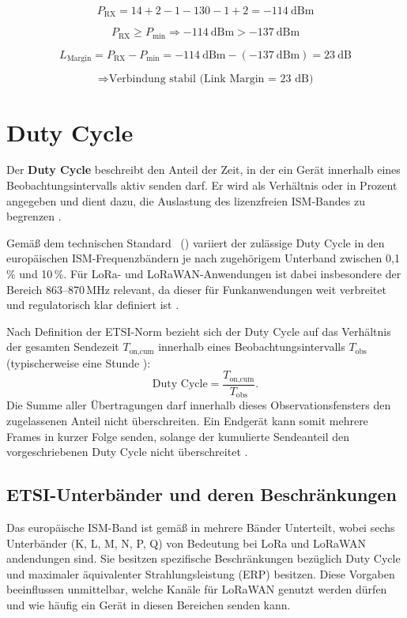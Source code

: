	\[
	P_\text{RX} = 14 + 2 - 1 - 130 - 1 + 2 = -114~\text{dBm}
	\]
	
	\[
	P_\text{RX} \geq P_\text{min} \Rightarrow -114~\text{dBm} > -137~\text{dBm}
	\]
	
	\[
	L_\text{Margin} = P_\text{RX} - P_\text{min} = -114~\text{dBm} - (-137~\text{dBm}) = 23~\text{dB}
	\]
	
	
	\[
	\Rightarrow \text{Verbindung stabil (Link Margin = 23~dB)}
	\]



\section{Duty Cycle}
	Der \textbf{Duty Cycle} beschreibt den Anteil der Zeit, in der ein Gerät innerhalb eines Beobachtungsintervalls aktiv senden darf. Er wird als Verhältnis oder in Prozent angegeben und dient dazu, die Auslastung des lizenzfreien ISM-Bandes zu begrenzen \cite{ETSI:2017}. 

	Gemä{\ss} dem technischen Standard ~(\cite{ETSI:2018b}) variiert der zulässige Duty Cycle in den europäischen ISM-Frequenzbändern je nach zugehörigem Unterband zwischen 0{,}1\,\% und 10\,\%. Für LoRa- und LoRaWAN-Anwendungen ist dabei insbesondere der Bereich 863–870\,MHz relevant, da dieser für Funkanwendungen weit verbreitet und regulatorisch klar definiert ist \cite{Montagny:2022}.

	Nach Definition der ETSI-Norm bezieht sich der Duty Cycle auf das Verhältnis der gesamten Sendezeit \(T_\text{on,cum}\) innerhalb eines Beobachtungsintervalls \(T_\text{obs}\) (typischerweise eine Stunde \cite{ETSI:2018}):
	\[
	\text{Duty Cycle} = \frac{T_\text{on,cum}}{T_\text{obs}}.
	\]
	Die Summe aller Übertragungen darf innerhalb dieses Observationsfensters den zugelassenen Anteil nicht überschreiten. Ein Endgerät kann somit mehrere Frames in kurzer Folge senden, solange der kumulierte Sendeanteil den vorgeschriebenen Duty Cycle nicht überschreitet \cite{ETSI:2017}.

\subsection{ETSI-Unterbänder und deren Beschränkungen}
	Das europäische ISM-Band ist gemä{\ss} \citeauthor[22]{ETSI:2018b} in mehrere Bänder Unterteilt, wobei sechs Unterbänder (K, L, M, N, P, Q) von Bedeutung bei LoRa und LoRaWAN andendungen sind.  Sie besitzen spezifische Beschränkungen bezüglich Duty Cycle und maximaler äquivalenter Strahlungsleistung (ERP) besitzen. Diese Vorgaben beeinflussen unmittelbar, welche Kanäle für LoRaWAN genutzt werden dürfen und wie häufig ein Gerät in diesen Bereichen senden kann.

